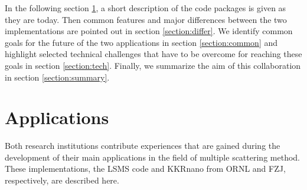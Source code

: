 \documentclass{llncs}
\def\KKRnano{{KKRnano}}
\def\LSMS{{LSMS}}
\begin{document}
In the following section \ref{section:apps}, a short description of the code packages is given as they are today.
Then common features and major differences between the two implementations are pointed out in section \ref{section:differ}.
We identify common goals for the future of the two applications in section \ref{section:common}
and highlight selected technical challenges that have to be overcome for reaching these goals in section \ref{section:tech}.
Finally, we summarize the aim of this collaboration in section \ref{section:summary}.

\section{Applications} \label{section:apps}

Both research institutions contribute experiences that are gained during the development
of their main applications in the field of multiple scattering method.
These implementations, the \LSMS{} code and \KKRnano{} from ORNL and FZJ, respectively, are described here.

\end{document}
